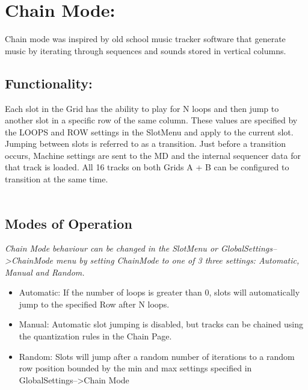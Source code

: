 \chapter{Chain Mode:}
Chain mode was inspired by old school music tracker software that generate music by iterating through sequences and sounds stored in vertical columns.
\section{Functionality:}
Each slot in the Grid has the ability to play for N loops and then jump to another slot in a specific row of the same column.  These values are specified by the LOOPS and ROW settings in the SlotMenu and apply to the current slot. Jumping between slots is referred to as a transition. Just before a transition occurs, Machine settings are sent to the MD and the internal sequencer data for that track is loaded. All 16 tracks on both Grids A + B can be configured to transition at the same time.\\
 \\
\section{Modes of Operation}
\textit{Chain Mode behaviour can be changed in the SlotMenu or GlobalSettings-->ChainMode menu by setting ChainMode to one of 3 three settings: Automatic, Manual and Random.}

\begin{itemize}
	\item Automatic: If the number of loops is greater than 0, slots will automatically jump to the specified Row after N loops.
	\item Manual: Automatic slot jumping is disabled, but tracks can be chained using the quantization rules in the Chain Page.
	\item Random: Slots will jump after a random number of iterations to a random row position bounded by the min and max settings specified in GlobalSettings-->Chain Mode
\end{itemize}


